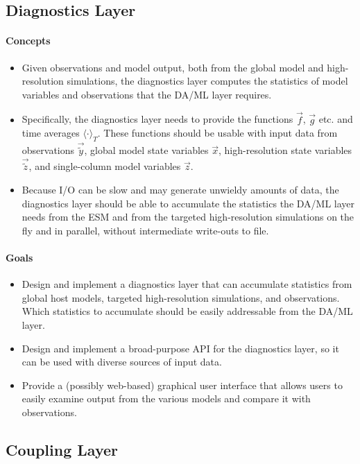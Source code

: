 \documentclass{article}
\begin{document}
\subsection{Diagnostics Layer}

\paragraph{Concepts}
\begin{itemize}
    \item  Given observations and model output, both from the global model and high-resolution simulations, the diagnostics layer computes the statistics of model variables and observations that the DA/ML layer requires.
    \item Specifically, the diagnostics layer needs to provide the functions $\vec{f}$, $\vec{g}$ etc. and time averages $\langle \cdot \rangle_T$. These functions should be usable with input data from observations $\vec{\tilde y}$, global model state variables $\vec{x}$, high-resolution state variables $\vec{\tilde z}$, and single-column model variables $\vec{z}$.
    \item Because I/O can be slow and may generate unwieldy amounts of data, the diagnostics layer should be able to accumulate the statistics the DA/ML layer needs from the ESM and from the targeted high-resolution simulations on the fly and in parallel, without intermediate write-outs to file.
\end{itemize}

\paragraph{Goals}
\begin{itemize}
    \item Design and implement a diagnostics layer that can accumulate statistics from global host models, targeted high-resolution simulations, and observations. Which statistics to accumulate should be easily addressable from the DA/ML layer.
    \item Design and implement a broad-purpose API for the diagnostics layer, so it can be used with diverse sources of input data. 
    \item Provide a (possibly web-based) graphical user interface that allows users to easily examine output from the various models and compare it with observations.
\end{itemize}

\subsection{Coupling Layer}
\end{document}
